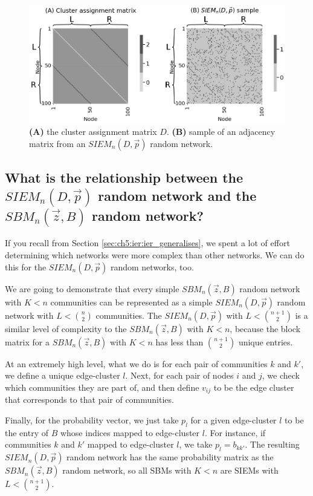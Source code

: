 \begin{figure}[h]
    \centering
    \includegraphics[width=\linewidth]{representations/ch5/Images/siem.png}
    \caption[Visualizing SIEM networks]{\textbf{(A)} the cluster assignment matrix $D$. \textbf{(B)} sample of an adjacency matrix from an $SIEM_n(D, \vec p)$ random network. }
    \label{fig:ch5:siem}
\end{figure}
\subsection{What is the relationship between the $SIEM_n(D, \vec p)$ random network and the $SBM_n(\vec z, B)$ random network?}

If you recall from Section \ref{sec:ch5:ier:ier_generalises}, we spent a lot of effort determining which networks were more complex than other networks. We can do this for the $SIEM_n(D, \vec p)$ random networks, too. 

We are going to demonstrate that every simple $SBM_n(\vec z, B)$ random network with $K < n$ communities can be represented as a simple $SIEM_n(D, \vec p)$ random network with $L < \binom n 2$ communities. The $SIEM_n(D, \vec p)$ with $L < \binom{n + 1}{2}$ is a similar level of complexity to the $SBM_n(\vec z, B)$ with $K < n$, because the block matrix for a $SBM_n(\vec z, B)$ with $K < n$ has less than $\binom{n + 1}{2}$ unique entries.

At an extremely high level, what we do is for each pair of communities $k$ and $k'$, we define a unique edge-cluster $l$. Next, for each pair of nodes $i$ and $j$, we check which communities they are part of, and then define $v_{ij}$ to be the edge cluster that corresponds to that pair of communities.

Finally, for the probability vector, we just take $p_l$ for a given edge-cluster $l$ to be the entry of $B$ whose indices mapped to edge-cluster $l$. For instance, if communities $k$ and $k'$ mapped to edge-cluster $l$, we take $p_l = b_{kk'}$. The resulting $SIEM_n(D, \vec p)$ random network has the same probability matrix as the $SBM_n(\vec z, B)$ random network, so all SBMs  with $K < n$ are SIEMs with $L < \binom{n + 1}{2}$.

